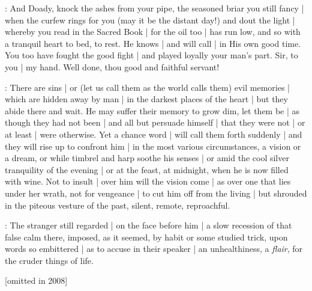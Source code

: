 :
And Doady,
knock the ashes from your pipe,
the seasoned briar you still fancy |
when the curfew rings for you
(may it be the distant day!)
and dout the light |
whereby you read in the Sacred Book |
for the oil too |
has run low,
and so with a tranquil heart to bed,
to rest.
He knows |
and will call |
in His own good time.
You too have fought the good fight |
and played loyally your man's part.
Sir,
to you |
my hand.
Well done,
thou good and faithful servant!


:
There are sins |
or
(let us call them as the world calls them)
evil memories |
which are hidden away by man |
in the darkest places of the heart |
but they abide there and wait.
He may suffer their memory to grow dim,
let them be |
as though they had not been |
and all but persuade himself |
that they were not |
or at least |
were otherwise.
Yet a chance word |
will call them forth suddenly |
and they will rise up to confront him |
in the most various circumstances,
a vision or a dream,
or while timbrel and harp soothe his senses |
or amid the cool silver tranquility of the evening |
or at the feast,
at midnight,
when he is now filled with wine.
Not to insult |
over him will the vision come |
as over one that lies under her wrath,
not for vengeance |
to cut him off from the living |
but shrouded in the piteous vesture of the past,
silent,
remote,
reproachful.


:
The stranger still regarded |
on the face before him |
a slow recession of that false calm there,
imposed,
as it seemed,
by habit or some studied trick,
upon words so embittered |
as to accuse in their speaker |
an unhealthiness,
a \emph{flair},
for the cruder things of life.

[omitted in 2008]

